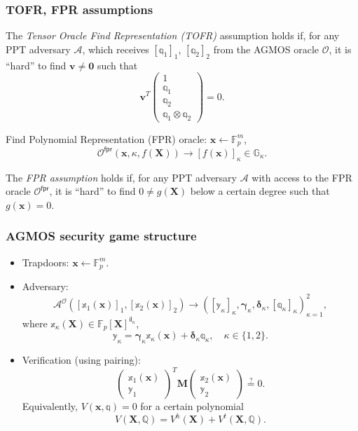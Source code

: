 \documentclass[9pt]{beamer}
\newcommand{\F}{\mathbb{F}}
\newcommand{\G}{\mathbb{G}}
\newcommand{\A}{\mathcal A}  %
\newcommand{\Oracle}{\mathcal{O}}  %
\newcommand{\il}{\mathsf{il}}  %
\newcommand{\fpr}{\mathsf{fpr}}  %
\begin{document}
\begin{frame}
\frametitle{TOFR, FPR assumptions}
\begin{definition}
    The \emph{Tensor Oracle Find Representation (TOFR)} assumption holds if, for any PPT adversary $ \A $, which receives $ [\mathbb q_1]_1 $, $ [\mathbb q_2]_2 $ from the AGMOS oracle $ \Oracle $, it is ``hard'' to find $ \bm v \neq \bm 0 $ such that
    \[
    \bm v^T 
    \begin{pmatrix}
         1 \\
         \mathbb q_1 \\
         \mathbb q_2 \\
         \mathbb q_1 \otimes \mathbb q_2
    \end{pmatrix}
    = 0.
    \]
\end{definition}
Find Polynomial Representation (FPR) oracle: $ \bm x \gets \F_p^m $, 
\[ 
\Oracle^\fpr(\bm x, \kappa, f(\bm X)) \to [f(\bm x)]_\kappa \in \G_\kappa.
\]
\begin{definition}
    The \textit{FPR assumption} holds if, for any PPT adversary $ \A $ with access to the FPR oracle $ \Oracle^\fpr $, it is ``hard'' to find $ 0 \neq g(\bm X) $ below a certain degree such that $ g(\bm x) = 0 $.
\end{definition}
\end{frame}


\begin{frame}
\frametitle{AGMOS security game structure}
\begin{itemize}
    \item Trapdoors: $ \bm x \gets \F_p^m $.
    \item Adversary:
    \[
    \A^\Oracle([\mathbb x_1(\bm x)]_1, [\mathbb x_2(\bm x)]_2) \to
    ([\mathbb y_\kappa]_\kappa, \bm \gamma_\kappa, \bm \delta_\kappa, [\mathbb q_\kappa]_\kappa)_{\kappa=1}^2,
    \]
    where $ \mathbb x_\kappa(\bm X) \in \F_p[\bm X]^{\il_\kappa} $, 
    \[
    \mathbb y_\kappa = \bm{\gamma}_\kappa \mathbb x_\kappa(\bm x) + \bm \delta_\kappa \mathbb q_\kappa, \quad 
    \kappa \in \{ 1, 2 \}.
    \]
    \item Verification (using pairing):
    \[
        \begin{pmatrix}
           \mathbb x_1(\bm x) \\
           \mathbb y_1
        \end{pmatrix}^T
        \bm M
        \begin{pmatrix}
           \mathbb x_2(\bm x) \\
           \mathbb y_2
        \end{pmatrix} \overset{?}{=} 0.
    \]
    Equivalently, $ V(\bm x, \mathbb q) = 0 $ for a certain polynomial
    \[
    V(\bm X, \mathbb Q) = V^h(\bm X) + V^t(\bm X, \mathbb Q).
    \]
\end{itemize}
\end{frame}
\end{document}

